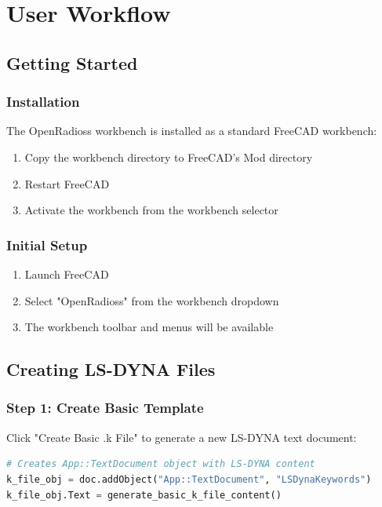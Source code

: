 \documentclass[12pt,a4paper]{article}
\begin{document}
\section{User Workflow}

\subsection{Getting Started}

\subsubsection{Installation}
The OpenRadioss workbench is installed as a standard FreeCAD workbench:

\begin{enumerate}
    \item Copy the workbench directory to FreeCAD's Mod directory
    \item Restart FreeCAD
    \item Activate the workbench from the workbench selector
\end{enumerate}

\subsubsection{Initial Setup}
\begin{enumerate}
    \item Launch FreeCAD
    \item Select "OpenRadioss" from the workbench dropdown
    \item The workbench toolbar and menus will be available
\end{enumerate}

\subsection{Creating LS-DYNA Files}

\subsubsection{Step 1: Create Basic Template}
Click "Create Basic .k File" to generate a new LS-DYNA text document:

\begin{lstlisting}[language=Python, caption=Creating LS-DYNA text document]
# Creates App::TextDocument object with LS-DYNA content
k_file_obj = doc.addObject("App::TextDocument", "LSDynaKeywords")
k_file_obj.Text = generate_basic_k_file_content()
\end{lstlisting}
\end{document}
